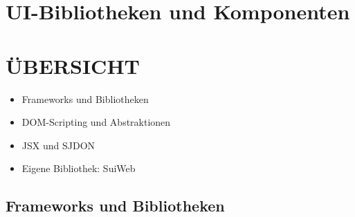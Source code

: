 \section{UI-Bibliotheken und Komponenten}

\section*{ÜBERSICHT}
\begin{itemize}
  \item Frameworks und Bibliotheken
  \item DOM-Scripting und Abstraktionen
  \item JSX und SJDON
  \item Eigene Bibliothek: SuiWeb
\end{itemize}

\subsection{Frameworks und Bibliotheken}

